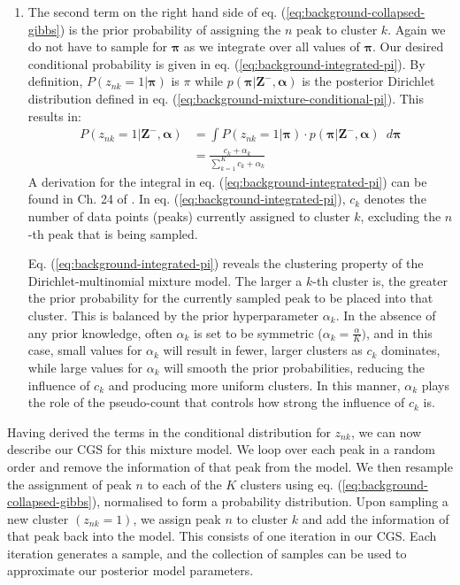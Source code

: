 \begin{enumerate}
\item The second term on the right hand side of eq. (\ref{eq:background-collapsed-gibbs}) is the prior probability of assigning the $n$ peak to cluster $k$. Again we do not have to sample for $\boldsymbol{\pi}$ as we integrate over all values of $\boldsymbol{\pi}$. Our desired conditional probability is given in eq. (\ref{eq:background-integrated-pi}). By definition, $P(z_{nk}=1 \vert \boldsymbol{\pi})$ is $\pi$ while $p(\boldsymbol{\pi} \vert \boldsymbol{Z}^{-}, \boldsymbol{\alpha})$ is the posterior Dirichlet distribution defined in eq. (\ref{eq:background-mixture-conditional-pi}). This results in:
\begin{equation}
\begin{aligned}
P(z_{nk}=1 \vert \boldsymbol{Z}^{-}, \boldsymbol{\alpha}) &= \int P(z_{nk}=1 \vert \boldsymbol{\pi}) \cdot p(\boldsymbol{\pi} \vert \boldsymbol{Z}^{-}, \boldsymbol{\alpha}) \enspace d\boldsymbol{\pi} \\
                                                                                         &= \frac{c_k + \alpha_k}{\sum_{k=1}^K c_{k} + \alpha_k}
\label{eq:background-integrated-pi}
\end{aligned}
\end{equation}
A derivation for the integral in eq. (\ref{eq:background-integrated-pi}) can be found in Ch. 24 of \cite{murphy2012machine}. In eq. (\ref{eq:background-integrated-pi}), $c_{k}$ denotes the number of data points (peaks) currently assigned to cluster $k$,  excluding the $n$-th peak that is being sampled. 

Eq. (\ref{eq:background-integrated-pi}) reveals the clustering property of the Dirichlet-multinomial mixture model. The larger a $k$-th cluster is, the greater the prior probability for the currently sampled peak to be placed into that cluster. This is balanced by the prior hyperparameter $\alpha_k$. In the absence of any prior knowledge, often $\alpha_k$ is set to be symmetric ($\alpha_k=\frac{\alpha}{K})$, and in this case, small values for $\alpha_k$ will result in fewer, larger clusters as $c_k$ dominates, while large values for $\alpha_k$ will smooth the prior probabilities, reducing the influence of $c_k$ and producing more uniform clusters. In this manner, $\alpha_k$ plays the role of the pseudo-count that controls how strong the influence of $c_k$ is. 
\end{enumerate}

Having derived the terms in the conditional distribution for $z_{nk}$, we can now describe our CGS for this mixture model. We loop over each peak in a random order and remove the information of that peak from the model. We then resample the assignment of peak $n$ to each of the $K$ clusters using eq. (\ref{eq:background-collapsed-gibbs}), normalised to form a probability distribution. Upon sampling a new cluster $\left(z_{nk}=1\right)$, we assign peak $n$ to cluster $k$ and add the information of that peak back into the model. This consists of one iteration in our CGS. Each iteration generates a sample, and the collection of samples can be used to approximate our posterior model parameters.

